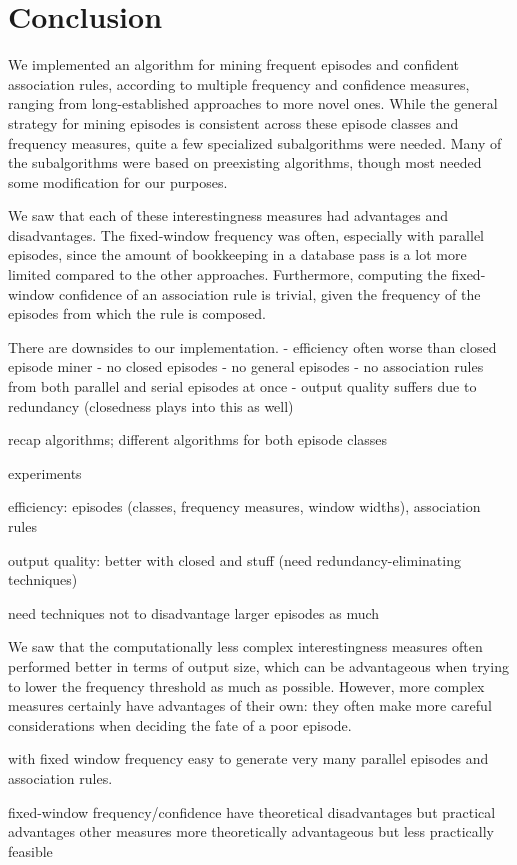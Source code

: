 \chapter{Conclusion}


We implemented an algorithm for mining frequent episodes and confident association rules, according to multiple frequency and confidence measures, ranging from long-established approaches to more novel ones. While the general strategy for mining episodes is consistent across these episode classes and frequency measures, quite a few specialized subalgorithms were needed. Many of the subalgorithms were based on preexisting algorithms, though most needed some modification for our purposes.


We saw that each of these interestingness measures had advantages and disadvantages. The fixed-window frequency was often, especially with parallel episodes, since the amount of bookkeeping in a database pass is a lot more limited compared to the other approaches. Furthermore, computing the fixed-window confidence of an association rule is trivial, given the frequency of the episodes from which the rule is composed.


There are downsides to our implementation.
- efficiency often worse than closed episode miner
- no closed episodes
- no general episodes
- no association rules from both parallel and serial episodes at once
- output quality suffers due to redundancy (closedness plays into this as well)

recap algorithms; different algorithms for both episode classes

experiments

efficiency: episodes (classes, frequency measures, window widths), association rules

output quality: better with closed and stuff (need redundancy-eliminating techniques)

need techniques not to disadvantage larger episodes as much

We saw that the computationally less complex interestingness measures often performed better in terms of output size, which can be advantageous when trying to lower the frequency threshold as much as possible. However, more complex measures certainly have advantages of their own: they often make more careful considerations when deciding the fate of a poor episode.

with fixed window frequency easy to generate very many parallel episodes and association rules.

fixed-window frequency/confidence have theoretical disadvantages but practical advantages
other measures more theoretically advantageous but less practically feasible
